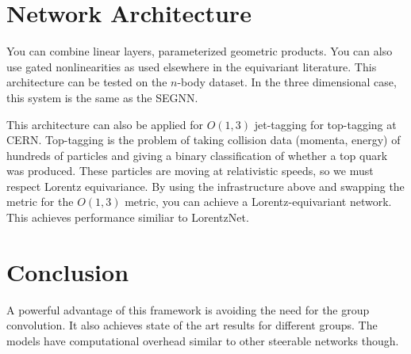 \documentclass[book.tex]{subfiles}
\begin{document}
\section{Network Architecture}
You can combine linear layers, parameterized geometric products. You can also use gated nonlinearities as used elsewhere in the equivariant literature. This architecture can be tested on the $n$-body dataset. In the three dimensional case, this system is the same as the SEGNN.

This architecture can also be applied for $O(1, 3)$ jet-tagging for top-tagging at CERN. Top-tagging is the problem of taking collision data (momenta, energy) of hundreds of particles and giving a binary classification of whether a top quark was produced. These particles are moving at relativistic speeds, so we must respect Lorentz equivariance. By using the infrastructure above and swapping the metric for the $O(1, 3)$ metric, you can achieve a Lorentz-equivariant network. This achieves performance similiar to LorentzNet.

\section{Conclusion}
A powerful advantage of this framework is avoiding the need for the group convolution. It also achieves state of the art results for different groups. The models have computational overhead similar to other steerable networks though.
\end{document}
